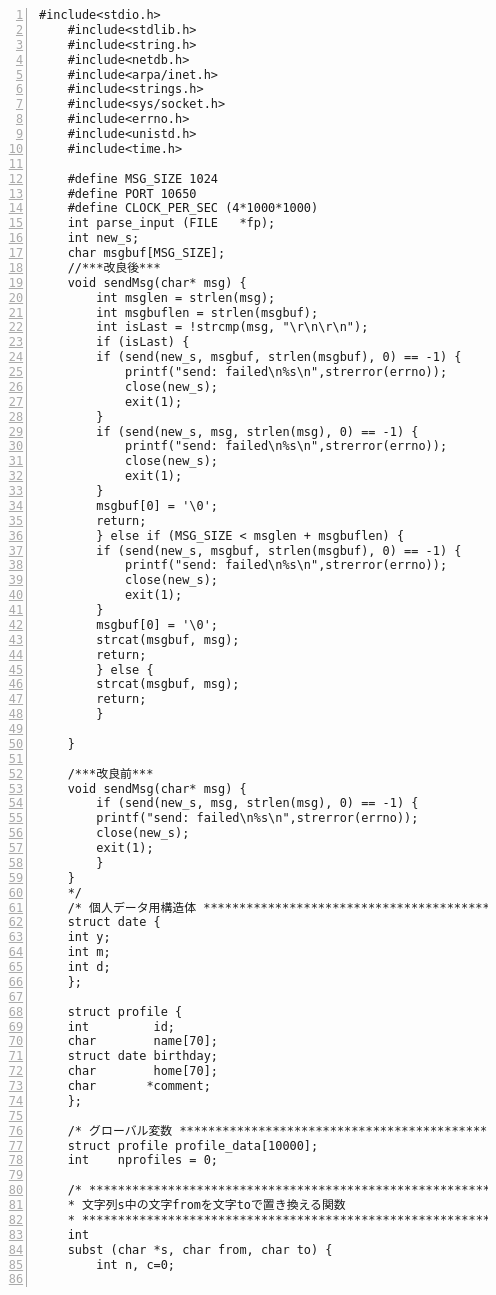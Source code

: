 \documentclass[11pt]{jarticle}
\begin{document}
\begin{lstlisting}[caption=サーバ側プログラム,label=server,numbers=left]
    #include<stdio.h>
    #include<stdlib.h>
    #include<string.h>
    #include<netdb.h>
    #include<arpa/inet.h>
    #include<strings.h>
    #include<sys/socket.h>
    #include<errno.h>
    #include<unistd.h>
    #include<time.h>

    #define MSG_SIZE 1024
    #define PORT 10650
    #define CLOCK_PER_SEC (4*1000*1000)
    int parse_input (FILE	*fp);
    int new_s;
    char msgbuf[MSG_SIZE];
    //***改良後***
    void sendMsg(char* msg) {
        int msglen = strlen(msg);
        int msgbuflen = strlen(msgbuf);
        int isLast = !strcmp(msg, "\r\n\r\n");
        if (isLast) {
        if (send(new_s, msgbuf, strlen(msgbuf), 0) == -1) {
            printf("send: failed\n%s\n",strerror(errno));
            close(new_s);
            exit(1);
        }
        if (send(new_s, msg, strlen(msg), 0) == -1) {
            printf("send: failed\n%s\n",strerror(errno));
            close(new_s);
            exit(1);
        }
        msgbuf[0] = '\0';
        return;
        } else if (MSG_SIZE < msglen + msgbuflen) {
        if (send(new_s, msgbuf, strlen(msgbuf), 0) == -1) {
            printf("send: failed\n%s\n",strerror(errno));
            close(new_s);
            exit(1);
        }
        msgbuf[0] = '\0';
        strcat(msgbuf, msg);
        return;
        } else {
        strcat(msgbuf, msg);
        return;
        }
        
    } 
    
    /***改良前***
    void sendMsg(char* msg) {
        if (send(new_s, msg, strlen(msg), 0) == -1) {
        printf("send: failed\n%s\n",strerror(errno));
        close(new_s);
        exit(1);
        }
    }
    */
    /* 個人データ用構造体 ******************************************** */
    struct date {
    int y;
    int m;
    int d;
    };

    struct profile {
    int         id;
    char        name[70];
    struct date birthday;
    char        home[70];
    char       *comment;
    };

    /* グローバル変数 ************************************************ */
    struct profile profile_data[10000];
    int    nprofiles = 0;

    /* ************************************************************** *
    * 文字列s中の文字fromを文字toで置き換える関数
    * *************************************************************** */
    int
    subst (char *s, char from, char to) {
        int n, c=0;


\end{lstlisting}
\end{document}

